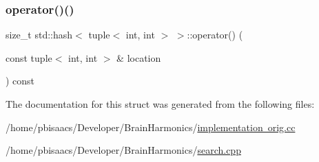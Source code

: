 \mbox{\label{structstd_1_1hash_3_01tuple_3_01int_00_01int_01_4_01_4_af46854ec2c5aa6cd6d1cd164374bd54f}} 
\subsubsection{\texorpdfstring{operator()()}{operator()()}\hspace{0.1cm}{\footnotesize\ttfamily [2/2]}}
{\footnotesize\ttfamily size\+\_\+t std\+::hash$<$ tuple$<$ int, int $>$ $>$\+::operator() (\begin{DoxyParamCaption}\item[{const tuple$<$ int, int $>$ \&}]{location }\end{DoxyParamCaption}) const\hspace{0.3cm}{\ttfamily [inline]}}



The documentation for this struct was generated from the following files\+:\begin{DoxyCompactItemize}
\item 
/home/pbisaacs/\+Developer/\+Brain\+Harmonics/\mbox{\hyperlink{implementation_01orig_8cc}{implementation orig.\+cc}}\item 
/home/pbisaacs/\+Developer/\+Brain\+Harmonics/\mbox{\hyperlink{search_8cpp}{search.\+cpp}}\end{DoxyCompactItemize}
